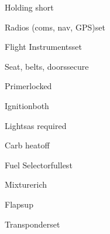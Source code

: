 \begin{multicols}{2}
\begin{checklist}{Holding short}
    \item{Radios (coms, nav, GPS)}{set}
    \item{Flight Instruments}{set}
    \item{Seat, belts, doors}{secure}
    \item{Primer}{locked}
    \item{Ignition}{both}
    \item{Lights}{as required}
    \item{Carb heat}{off}
    \item{Fuel Selector}{fullest}
    \item{Mixture}{rich}
    \item{Flaps}{up}
    \item{Transponder}{set}
\end{checklist}

\end{multicols}
